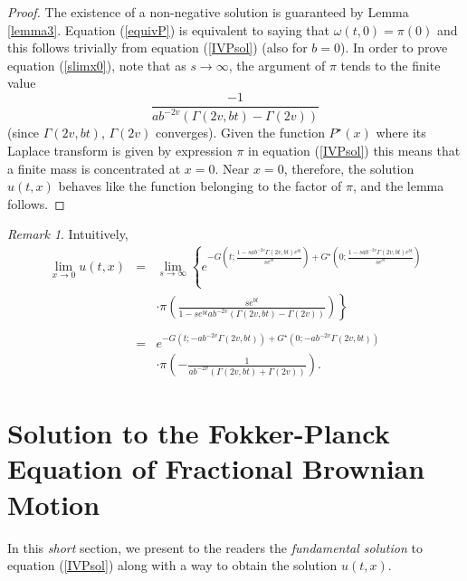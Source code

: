 \documentclass[preprint, 12pt]{elsarticle}
\numberwithin{equation}{section}
\theoremstyle{plain}
\theoremstyle{remark}
\newtheorem{remark}{Remark}[section]
\newcommand{\nocomma}{}
\begin{document}
\begin{proof}
The existence of a non-negative solution is guaranteed by Lemma \ref{lemma3}. Equation (\ref{equivP}) is equivalent to saying that $\omega (t, 0) = \pi (0)$ and this follows trivially from equation (\ref{IVPsol}) (also for $b = 0$). In order to prove equation (\ref{slimx0}), note that as $s \rightarrow \infty$, the argument of $\pi$ tends to the finite value
\[\frac{- 1}{a b^{- 2 v} (\Gamma (2 v \nocomma, b t)-\Gamma(2v))}\]
(since $\Gamma (2 v \nocomma, b t)$, $\Gamma(2v)$ converges). Given the function $P^{\star} (x)$ where its Laplace transform is given by expression $\pi$ in equation (\ref{IVPsol}) this means that a finite mass is concentrated at $x = 0$. Near $x = 0$, therefore, the solution $u (t, x)$ behaves like the function belonging to the factor of $\pi$, and the lemma follows.
\end{proof}

\begin{remark}
Intuitively,
\begin{eqnarray*}
\lim_{x \rightarrow 0} u (t, x) & = & \lim_{s \rightarrow \infty} \left\{ e^{- G \left( t ; \frac{1 - s a b^{- 2 v} \Gamma (2 v \nocomma, b t) e^{b t}}{s e^{bt}} \right) + G^{\star} \left( 0 ; \frac{1 - s a b^{- 2 v} \Gamma (2 v \nocomma, bt) e^{bt}}{s e^{bt}} \right)} \right.\\
& & \left. \cdot \pi \left( \frac{s e^{bt}}{1 - s e^{bt} a b^{- 2 v}  (\Gamma (2 v \nocomma, b t) - \Gamma (2 v \nocomma))} \right) \right\} \\
& & \\
& = & e^{- G (t ; - a b^{- 2 v} \Gamma (2 v \nocomma, b t)) + G^{\star} \left(0 ; - a b^{- 2 v} \Gamma (2 v \nocomma, bt)\right)}\\ 
& & \cdot \pi \left( - \frac{1}{a b^{- 2 v} \left( \Gamma (2 v \nocomma, b t) + \Gamma(2v)\right)} \right).
\end{eqnarray*}
\end{remark}

\section{Solution to the Fokker-Planck Equation of Fractional Brownian Motion}\label{solution}

In this \emph{short} section, we present to the readers the \textit{fundamental solution} to equation (\ref{IVPsol}) along with a way to obtain the solution $u (t, x)$.
\end{document}
